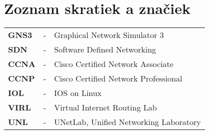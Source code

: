 \chapter*{Zoznam skratiek a značiek}

\begin{longtabu} to \textwidth {X[0.5,l] X[0.2,c] X[5,l]}
    \textbf{GNS3} & - & Graphical Network Simulator 3 \\
    \textbf{SDN} & - & Software Defined Networking \\
    \textbf{CCNA} & - & Cisco Certified Network Associate \\
    \textbf{CCNP} & - & Cisco Certified Network Professional \\
    \textbf{IOL} & - & IOS on Linux \\
    \textbf{VIRL} & - & Virtual Internet Routing Lab \\
    \textbf{UNL} & - & UNetLab, Unified Networking Laboratory \\
\end{longtabu}